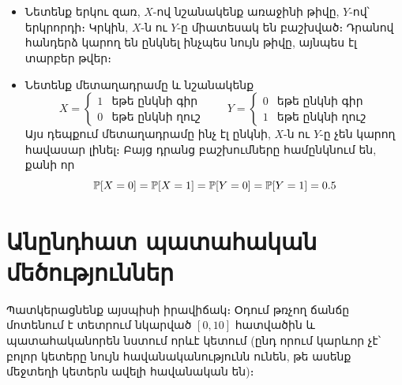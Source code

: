 \begin{example}
\\~
\begin{itemize}
\item Նետենք երկու զառ, $X$-ով նշանակենք առաջինի թիվը, $Y$-ով՝ երկրորդի։ Կրկին, $X$-ն ու $Y$-ը միատեսակ են բաշխված։ Դրա\-նով հանդերձ կարող են ընկնել ինչպես նույն թիվը, այնպես էլ տարբեր թվեր։%

\item Նետենք մետաղադրամը և նշանակենք
\[
X = \begin{cases}
    1 & \text{եթե ընկնի գիր}\\
    0 & \text{եթե ընկնի ղուշ}
\end{cases}
\qquad 
Y = \begin{cases}
    0 & \text{եթե ընկնի գիր}\\
    1 & \text{եթե ընկնի ղուշ}
\end{cases}
\]
Այս դեպքում մետաղադրամը ինչ էլ ընկնի, $X$-ն ու $Y$-ը չեն կարող հավասար լինել։ Բայց դրանց բաշխումները համընկնում են, քանի որ
\[
\mathbb{P}[X = 0] = \mathbb{P}[X = 1] = \mathbb{P}[Y = 0] = \mathbb{P}[Y = 1] = 0.5
\]
\end{itemize}
\end{example}



\section{Անընդհատ պատահական մեծություններ}

Պատկերացնենք այսպիսի իրավիճակ։ Օդում թռչող ճանճը մոտենում է տետրում նկարված $[0, 10]$ հատվածին և պատահականորեն նստում որևէ կետում (ընդ որում կարևոր չէ՝ բոլոր կետերը նույն հավանականությունն ունեն, թե ասենք մեջտեղի կետերն ավելի հավանական են)։

\begin{center}
\end{center}

